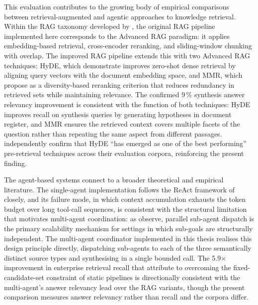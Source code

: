 This evaluation contributes to the growing body of empirical comparisons between retrieval-augmented and agentic approaches to knowledge retrieval. Within the RAG taxonomy developed by , the original RAG pipeline implemented here corresponds to the Advanced RAG paradigm: it applies embedding-based retrieval, cross-encoder reranking, and sliding-window chunking with overlap. The improved RAG pipeline extends this with two Advanced RAG techniques: HyDE, which  demonstrate improves zero-shot dense retrieval by aligning query vectors with the document embedding space, and MMR, which  propose as a diversity-based reranking criterion that reduces redundancy in retrieved sets while maintaining relevance. The confirmed 9\,\% synthesis answer relevancy improvement is consistent with the function of both techniques: HyDE improves recall on synthesis queries by generating hypotheses in document register, and MMR ensures the retrieved context covers multiple facets of the question rather than repeating the same aspect from different passages.  independently confirm that HyDE ``has emerged as one of the best performing'' pre-retrieval techniques across their evaluation corpora, reinforcing the present finding.

The agent-based systems connect to a broader theoretical and empirical literature. The single-agent implementation follows the ReAct framework of  closely, and its failure mode, in which context accumulation exhausts the token budget over long tool-call sequences, is consistent with the structural limitation that motivates multi-agent coordination: as  observe, parallel sub-agent dispatch is the primary scalability mechanism for settings in which sub-goals are structurally independent. The multi-agent coordinator implemented in this thesis realises this design principle directly, dispatching sub-agents to each of the three semantically distinct source types and synthesising in a single bounded call. The 5.9$\times$ improvement in enterprise retrieval recall that  attribute to overcoming the fixed-candidate-set constraint of static pipelines is directionally consistent with the multi-agent's answer relevancy lead over the RAG variants, though the present comparison measures answer relevancy rather than recall and the corpora differ.


